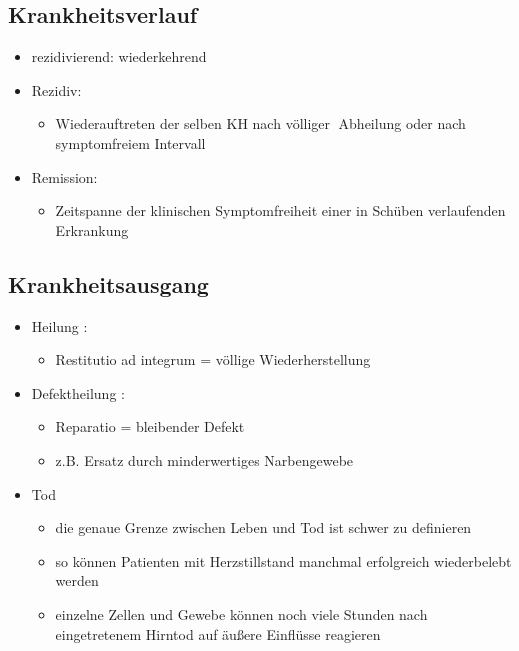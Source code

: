 \begin{it>emize}
\subsection{Krankheitsverlauf}
	\begin{itemize}
		\item rezidivierend: wiederkehrend
		\item Rezidiv:
			\begin{itemize}
				\item Wiederauftreten der selben KH nach völliger Abheilung oder nach symptomfreiem Intervall
			\end{itemize}
		\item Remission:
			\begin{itemize}
				\item Zeitspanne der klinischen Symptomfreiheit einer in Schüben verlaufenden Erkrankung
			\end{itemize}
	\end{itemize}

\subsection{Krankheitsausgang}
	\begin{itemize}
		\item Heilung :
			\begin{itemize}
				\item Restitutio ad integrum = völlige Wiederherstellung
			\end{itemize}
		\item Defektheilung :
			\begin{itemize}
				\item Reparatio = bleibender Defekt
				\item z.B. Ersatz durch minderwertiges Narbengewebe
			\end{itemize}
		\item Tod
			\begin{itemize}
				\item die genaue Grenze zwischen Leben und Tod ist schwer zu definieren
				\item so können Patienten mit Herzstillstand manchmal erfolgreich wiederbelebt werden
				\item einzelne Zellen und Gewebe können noch viele Stunden nach eingetretenem Hirntod auf äußere Einflüsse reagieren
			\end{itemize}
	\end{itemize}


\end{it>emize}
